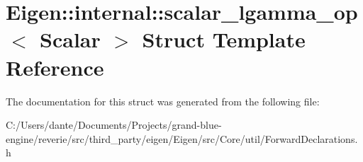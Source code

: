 \hypertarget{struct_eigen_1_1internal_1_1scalar__lgamma__op}{}\section{Eigen\+::internal\+::scalar\+\_\+lgamma\+\_\+op$<$ Scalar $>$ Struct Template Reference}
\label{struct_eigen_1_1internal_1_1scalar__lgamma__op}


The documentation for this struct was generated from the following file\+:\begin{DoxyCompactItemize}
\item 
C\+:/\+Users/dante/\+Documents/\+Projects/grand-\/blue-\/engine/reverie/src/third\+\_\+party/eigen/\+Eigen/src/\+Core/util/Forward\+Declarations.\+h\end{DoxyCompactItemize}
